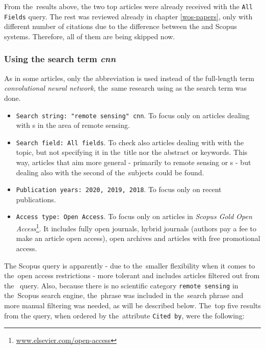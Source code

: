 From the~results above, the two top articles were already received with the \verb|All Fields| query. The rest was reviewed already in chapter \ref{wos-papers}, only with different number of citations due to the difference between the  and Scopus systems. Therefore, all of them are being skipped now.

\subsubsection{Using the search term \textit{cnn}}
\label{scopus-papers-cnn}

As in some articles, only the abbreviation \textit{} is used instead of the full-length term \textit{convolutional neural network}, the~same research using \textit{} as the search term was done.

\begin{itemize}
	\item \verb|Search string: "remote sensing" cnn|. To focus only on articles dealing with s in the area of remote sensing.
	\item \verb|Search field: All fields|. To check also articles dealing with with the topic, but not specifying it in the~title nor the abstract or keywords. This way, articles that aim more general - primarily to remote sensing or s - but dealing also with the second of the~subjects could be found.
	\item \verb|Publication years: 2020, 2019, 2018|. To focus only on recent publications.
	\item \verb|Access type: Open Access|. To focus only on articles in \textit{Scopus Gold Open Access}\footnote{\url{www.elsevier.com/open-access}}. It includes fully open journals, hybrid journals (authors pay a fee to make an article open access), open archives and articles with free promotional access.
\end{itemize}

\noindent The Scopus query is apparently - due to the~smaller flexibility when it comes to the~open access restrictions - more tolerant and includes articles filtered out from the~ query. Also, because there is no scientific category \verb|remote sensing| in the~Scopus search engine, the~phrase was included in the~search phrase and more manual filtering was needed, as will be described below. The~top five results from the query, when ordered by the~attribute \verb|Cited by|, were the following:

